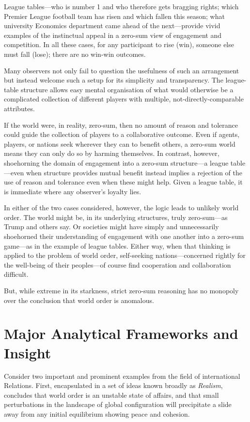 League tables---who is number 1 and who
therefore gets bragging rights;
which Premier League football team has risen and which
fallen this season; what university Economics department
came ahead of the next---provide vivid
examples of the instinctual appeal in a zero-sum view
of engagement and competition.
In all these cases, for any participant to rise (win),
someone else must fall (lose); there are no win-win outcomes.

Many observers not only fail to question the usefulness of such an
arrangement but instead welcome such a setup for its simplicity and
transparency.
The league-table structure allows easy mental organisation of
what would otherwise be a complicated collection of different players
with multiple, not-directly-comparable attributes.

If the world were, in reality, zero-sum, then no amount of reason
and tolerance could guide the collection of players to a
collaborative outcome.
Even if agents, players, or nations seek wherever they can
to benefit others, a zero-sum world means they can only do so
by harming themselves.
In contrast, however, shoehorning the domain of engagement
into a zero-sum structure---a league table---even when structure
provides mutual benefit instead implies a
rejection of the use of reason and tolerance even when these might help.
Given a league table, it is immediate
where any observer's loyalty lies.


In either of the two cases considered, however,
the logic leads to unlikely world order.
The world might be, in its underlying structures,
truly zero-sum---as Trump and others say.
Or societies might have simply
and unnecessarily shoehorned their
understanding of engagement with one another into a zero-sum game---as
in the example of league tables.
Either way, when that thinking is applied to the problem
of world order,
self-seeking nations---concerned rightly for the well-being of their
peoples---of course find cooperation and collaboration difficult.

But, while extreme in its starkness,
strict zero-sum reasoning has no monopoly over the
conclusion that world order is anomalous.


\section{Major Analytical Frameworks and Insight}

Consider two important and prominent examples
from the field of international Relations.
First, encapsulated in a set of ideas known broadly as \textsl{Realism},
concludes that world order
is an unstable state of affairs, and that
small perturbations in the landscape of global configuration
will precipitate a slide away from any initial equilibrium
showing peace and cohesion.

